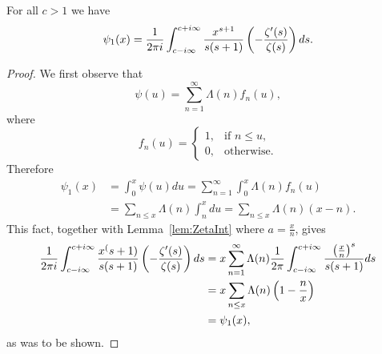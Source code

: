 \begin{proposition}\label{pro:ZetaQuotInt}
	For all $c > 1$ we have
\begin{equation*}
	\psi_1(x) = \frac{1}{2 \pi i} \int _{c - i\infty} ^{c + i \infty} \frac{x^{s + 1}}{s(s + 1)} \left(-\frac{\zeta'(s)}{\zeta(s)}\right) ds.
\end{equation*}
\end{proposition}
\begin{proof}
	We first observe that
\begin{equation*}
	\psi(u) = \sum _{n=1} ^\infty \Lambda(n) f_n(u),
\end{equation*}
	where
\begin{equation*}
	f_n(u) = 
		\left\{
    		\begin{array}{ll}
        		1, &\text{if } n \leq u,\\
        		0, &\text{otherwise}.
        	\end{array}
		\right.
\end{equation*}
	Therefore
\begin{equation*}
\begin{aligned}	
	\psi_1(x)
		&= \int _0 ^x \psi(u) du = \sum _{n = 1} ^\infty \int _0 ^x \Lambda(n) f_n(u) \\ 
		&= \sum _{n \leq x} \Lambda(n) \int _n ^x du = \sum _{n \leq x} \Lambda(n)(x - n).
\end{aligned}
\end{equation*}
	This fact, together with Lemma~\ref{lem:ZetaInt} where $a = \frac{x}{n}$, gives
\begin{equation*}
\begin{aligned}	
	\frac{1}{2 \pi i} \int _{c - i\infty} ^{c + i \infty} \frac{x^(s + 1)}{s(s + 1)} \left(-\frac{\zeta'(s)}{\zeta(s)}\right) ds 
		&= x \sum _{n = 1} ^\infty \Lambda(n) \frac{1}{2 \pi} \int _{c - i \infty} ^{c + i \infty} \frac{\left(\frac{x}{n}\right)^s}{s(s + 1)} ds \\
		&= x \sum _{n \leq x} \Lambda(n) \left(1 - \frac{n}{x}\right) \\
		&= \psi_1(x),
\end{aligned}
\end{equation*}
	as was to be shown.
\end{proof}



